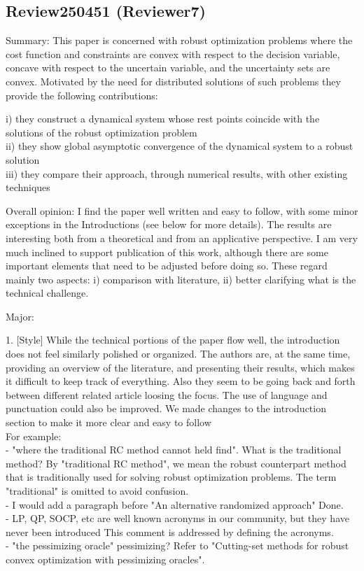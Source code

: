 \documentclass[journal,twoside,web]{ieeecolor}
\begin{document}
\subsection{Review250451 (Reviewer7)}

Summary: 
This paper is concerned with robust optimization problems where the cost function and constraints are convex with respect to the decision variable, concave with respect to the uncertain variable, and the uncertainty sets are convex. Motivated by the need for distributed solutions of such problems they provide the following contributions:

i) they construct a dynamical system whose rest points coincide with the solutions of the robust optimization problem\\
ii) they show global asymptotic convergence of the dynamical system to a robust solution\\
iii) they compare their approach, through numerical results, with other existing techniques

Overall opinion:
I find the paper well written and easy to follow, with some minor exceptions in the Introductions (see below for more details). The results are interesting both from a theoretical and from an applicative perspective. I am very much inclined to support publication of this work, although there are some important elements that need to be adjusted before doing so. These regard mainly two aspects: i) comparison with literature, ii) better clarifying what is the technical challenge.

Major:

1. [Style]
While the technical portions of the paper flow well, {\color{red}the introduction does not feel similarly polished or organized. The authors are, at the same time, providing an overview of the literature, and presenting their results, which makes it difficult to keep track of everything. Also they seem to be going back and forth between different related article loosing the focus. The use of language and punctuation could also be improved.} {\color{blue} We made changes to the introduction section to make it more clear and easy to follow}\\
For example:\\ 
- {\color{red}"where the traditional RC method cannot held find". What is the traditional method?} {\color{blue} By "traditional RC method", we mean the robust counterpart method that is traditionally used for solving robust optimization problems. The term "traditional" is omitted to avoid confusion.}\\
- {\color{red}I would add a paragraph before "An alternative randomized approach"} {\color{blue} Done.}\\
- {\color{red} LP, QP, SOCP, etc are well known acronyms in our community, but they have never been introduced} {\color{blue} This comment is addressed by defining the acronyms.}\\
- "the pessimizing oracle" pessimizing? {\color{blue} Refer to "Cutting-set methods for robust convex optimization with pessimizing oracles".}
\end{document}
